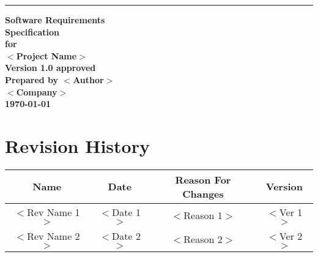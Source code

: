 \documentclass{scrreprt}
\date{}
\title{}
\def\myversion{1.0 }
\begin{document}
\begin{flushright}
    \rule{14cm}{5pt}
    \vskip1cm
    {\bfseries
        \Huge{Software Requirements\\ Specification}\\
        \vspace{1.6cm}
        for\\
        \vspace{1.6cm}
        $<$Project Name$>$\\
        \vspace{1.6cm}
        \LARGE{Version \myversion approved}\\
        \vspace{1.6cm}
        Prepared by $<$Author$>$\\
        \vspace{1.6cm}
        $<$Company$>$\\
        \vspace{1.6cm}
        \today\\
    }
\end{flushright}

\tableofcontents

\chapter*{Revision History}

\begin{center}
    \begin{tabular}{|c|c|c|c|}
        \hline
	    Name & Date & Reason For Changes & Version\\
        \hline
	    $<$Rev Name 1$>$ & $<$Date 1$>$ & $<$Reason 1$>$ & $<$Ver 1$>$\\
        \hline
	    $<$Rev Name 2$>$ & $<$Date 2$>$ & $<$Reason 2$>$ & $<$Ver 2$>$\\
        \hline
    \end{tabular}
\end{center}






\end{document}
